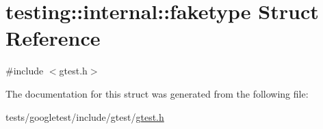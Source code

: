 \hypertarget{structtesting_1_1internal_1_1faketype}{}\section{testing\+:\+:internal\+:\+:faketype Struct Reference}
\label{structtesting_1_1internal_1_1faketype}


{\ttfamily \#include $<$gtest.\+h$>$}



The documentation for this struct was generated from the following file\+:\begin{DoxyCompactItemize}
\item 
tests/googletest/include/gtest/\hyperlink{gtest_8h}{gtest.\+h}\end{DoxyCompactItemize}
